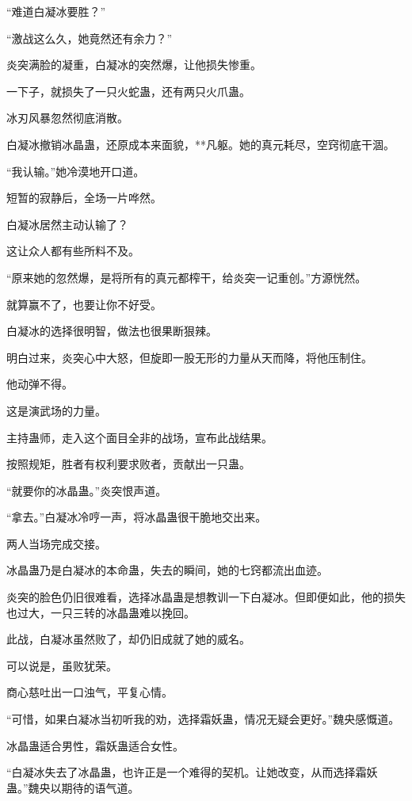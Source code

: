 \begin{this_body}
“难道白凝冰要胜？”

“激战这么久，她竟然还有余力？”

炎突满脸的凝重，白凝冰的突然爆，让他损失惨重。

一下子，就损失了一只火蛇蛊，还有两只火爪蛊。

冰刃风暴忽然彻底消散。

白凝冰撤销冰晶蛊，还原成本来面貌，**凡躯。她的真元耗尽，空窍彻底干涸。

“我认输。”她冷漠地开口道。

短暂的寂静后，全场一片哗然。

白凝冰居然主动认输了？

这让众人都有些所料不及。

“原来她的忽然爆，是将所有的真元都榨干，给炎突一记重创。”方源恍然。

就算赢不了，也要让你不好受。

白凝冰的选择很明智，做法也很果断狠辣。

明白过来，炎突心中大怒，但旋即一股无形的力量从天而降，将他压制住。

他动弹不得。

这是演武场的力量。

主持蛊师，走入这个面目全非的战场，宣布此战结果。

按照规矩，胜者有权利要求败者，贡献出一只蛊。

“就要你的冰晶蛊。”炎突恨声道。

“拿去。”白凝冰冷哼一声，将冰晶蛊很干脆地交出来。

两人当场完成交接。

冰晶蛊乃是白凝冰的本命蛊，失去的瞬间，她的七窍都流出血迹。

炎突的脸色仍旧很难看，选择冰晶蛊是想教训一下白凝冰。但即便如此，他的损失也过大，一只三转的冰晶蛊难以挽回。

此战，白凝冰虽然败了，却仍旧成就了她的威名。

可以说是，虽败犹荣。

商心慈吐出一口浊气，平复心情。

“可惜，如果白凝冰当初听我的劝，选择霜妖蛊，情况无疑会更好。”魏央感慨道。

冰晶蛊适合男性，霜妖蛊适合女性。

“白凝冰失去了冰晶蛊，也许正是一个难得的契机。让她改变，从而选择霜妖蛊。”魏央以期待的语气道。

\end{this_body}

